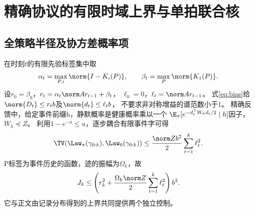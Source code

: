 \section{精确协议的有限时域上界与单拍联合核}
\label{app:single}
\subsection{全策略半径及协方差概率项}
在时刻$t$的有限先验标签集中取
\[
\alpha_t=\max_{P,i}\norm{I-K_i(P)},\qquad \beta_t=\max_P\norm{K_1(P)}.
\]
设$r_0=\beta_0$，$r_t=\alpha_t\norm A r_{t-1}+\beta_t$，
$\ell_0=0$，$\ell_t=\norm A r_{t-1}$。
式\eqref{eq:bias}给$\norm{D_t}\le r_tb$及$\norm{d_t}\le\ell_tb$，
不要求非对称增益的谱范数小于1。
精确反馈中，给定事件前缀h，静默概率是健康概率乘以一个
$\E_\pi[e^{-d_t^\top W_hd_t/2}\mid h]$因子，$W_h\preceq Z$。
利用$1-e^{-u}\le u$，逐步耦合有限事件字可得
\[
\TV(\Law_\pi(\gamma_{0:k}),\Law_0(\gamma_{0:k}))
\le\frac{\norm Z b^2}{2}\sum_{t=1}^k\ell_t^2.
\]
P标签为事件历史的函数，迹的振幅为$\Omega_k$，故
\[
J_k\le
\left(r_k^2+\frac{\Omega_k\norm Z}{2}\sum_{t=1}^k\ell_t^2\right)b^2.
\]
它与正文由记录分布得到的上界共同提供两个独立控制。


